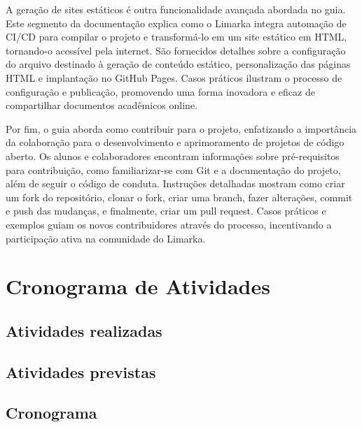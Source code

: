 \documentclass[
	12pt,				%
	oneside,			%
	a4paper,			%
	english,			%
	french,				%
	spanish,			%
	brazil				%
	]{abntex2}
\begin{document}
A geração de sites estáticos é outra funcionalidade avançada abordada no
guia. Este segmento da documentação explica como o Limarka integra
automação de CI/CD para compilar o projeto e transformá-lo em um site
estático em HTML, tornando-o acessível pela internet. São fornecidos
detalhes sobre a configuração do arquivo destinado à geração de conteúdo
estático, personalização das páginas HTML e implantação no GitHub Pages.
Casos práticos ilustram o processo de configuração e publicação,
promovendo uma forma inovadora e eficaz de compartilhar documentos
acadêmicos online.

Por fim, o guia aborda como contribuir para o projeto, enfatizando a
importância da colaboração para o desenvolvimento e aprimoramento de
projetos de código aberto. Os alunos e colaboradores encontram
informações sobre pré-requisitos para contribuição, como familiarizar-se
com Git e a documentação do projeto, além de seguir o código de conduta.
Instruções detalhadas mostram como criar um fork do repositório, clonar
o fork, criar uma branch, fazer alterações, commit e push das mudanças,
e finalmente, criar um pull request. Casos práticos e exemplos guiam os
novos contribuidores através do processo, incentivando a participação
ativa na comunidade do Limarka.

\hypertarget{cronograma-de-atividades}{%
\chapter{Cronograma de Atividades}\label{cronograma-de-atividades}}

\hypertarget{atividades-realizadas}{%
\section{Atividades realizadas}\label{atividades-realizadas}}

\hypertarget{atividades-previstas}{%
\section{Atividades previstas}\label{atividades-previstas}}

\hypertarget{cronograma}{%
\section{Cronograma}\label{cronograma}}

\postextual
\end{document}
